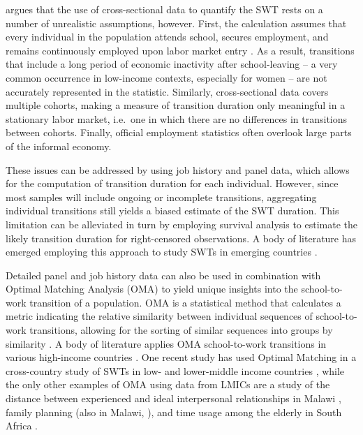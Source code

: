 \documentclass[
  a4paper, twoside, 12pt]{book}
\begin{document}
\textcite{nilsson2019} argues that the use of cross-sectional data to quantify the SWT rests on a number of unrealistic assumptions, however. First, the calculation assumes that every individual in the population attends school, secures employment, and remains continuously employed upon labor market entry \autocite{ohiggins2008}. As a result, transitions that include a long period of economic inactivity after school-leaving -- a very common occurrence in low-income contexts, especially for women -- are not accurately represented in the statistic. Similarly, cross-sectional data covers multiple cohorts, making a measure of transition duration only meaningful in a stationary labor market, i.e.~one in which there are no differences in transitions between cohorts. Finally, official employment statistics often overlook large parts of the informal economy.

These issues can be addressed by using job history and panel data, which allows for the computation of transition duration for each individual. However, since most samples will include ongoing or incomplete transitions, aggregating individual transitions still yields a biased estimate of the SWT duration. This limitation can be alleviated in turn by employing survival analysis to estimate the likely transition duration for right-censored observations. A body of literature has emerged employing this approach to study SWTs in emerging countries \autocites[e.g.][]{khan2013,nordman2015,manacorda2017}.

Detailed panel and job history data can also be used in combination with Optimal Matching Analysis (OMA) to yield unique insights into the school-to-work transition of a population. OMA is a statistical method that calculates a metric indicating the relative similarity between individual sequences of school-to-work transitions, allowing for the sorting of similar sequences into groups by similarity \autocite{elzinga2003}. A body of literature applies OMA school-to-work transitions in various high-income countries \autocite{schoon2001,mcvicar2002,brzinsky-fay2007,quintini2009,brzinsky-fay2014,brzinsky-fay2016,middeldorp2019}. One recent study has used Optimal Matching in a cross-country study of SWTs in low- and lower-middle income countries \autocite{pesando2021}, while the only other examples of OMA using data from LMICs are a study of the distance between experienced and ideal interpersonal relationships in Malawi \autocite{frye2015}, family planning (also in Malawi, \textcite{furnas2016}), and time usage among the elderly in South Africa \autocite{grapsa2016}.
\end{document}
